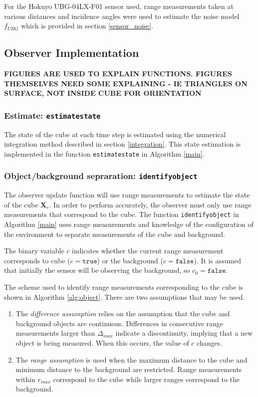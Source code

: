 	For the Hokuyo UBG-04LX-F01 sensor used, range measurements taken at various distances and incidence angles were used to estimate the noise model $f_{UBG}$ which is provided in section \ref{sensor_noise}.
	
\subsection{Observer Implementation}
	\textbf{FIGURES ARE USED TO EXPLAIN FUNCTIONS. FIGURES THEMSELVES NEED SOME EXPLAINING - IE TRIANGLES ON SURFACE, NOT INSIDE CUBE FOR ORIENTATION}
	\subsubsection{Estimate: \texttt{estimatestate}}
		The state of the cube at each time step is estimated using the numerical integration method described in section \ref{integration}. This state estimation is implemented in the function \texttt{estimatestate} in Algorithm \ref{main}.
	
	\subsubsection{Object/background sepraration: \texttt{identifyobject}}
		The observer update function will use range measurements to estimate the state of the cube $\mathbf{X}_c$. In order to perform accurately, the observer must only use range measurements that correspond to the cube. The function \texttt{identifyobject} in Algorithm \ref{main} uses range measurements and knowledge of the configuration of the environment to separate measurements of the cube and background.
		
		The binary variable $c$ indicates whether the current range measurement corresponds to cube ($c=\texttt{true}$) or the background ($c=\texttt{false}$). It is assumed that initially the sensor will be observing the background, so $c_0=\texttt{false}$.

		The scheme used to identify range measurements corresponding to the cube is shown in Algorithm \ref{alg:object}. There are two assumptions that may be used.
		\begin{enumerate}
		\item The \textit{difference assumption} relies on the assumption that the cube and background objects are continuous. Differences in consecutive range measurements larger than $\Delta_{max}$ indicate a discontinuity, implying that a new object is being measured. When this occurs, the value of $c$ changes.
		\item The \textit{range assumption} is used when the maximum distance to the cube and minimum distance to the background are restricted. Range measurements within $r_{max}$ correspond to the cube while larger ranges correspond to the background.
		\end{enumerate}
		
